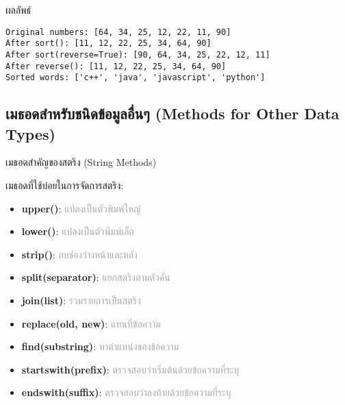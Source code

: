 \documentclass[12pt,a4paper]{article}
\newcommand{\textlight}[1]{{\thailightfont #1}}
\begin{document}
\begin{resultbox}{ผลลัพธ์}
\begin{verbatim}
Original numbers: [64, 34, 25, 12, 22, 11, 90]
After sort(): [11, 12, 22, 25, 34, 64, 90]
After sort(reverse=True): [90, 64, 34, 25, 22, 12, 11]
After reverse(): [11, 12, 22, 25, 34, 64, 90]
Sorted words: ['c++', 'java', 'javascript', 'python']
\end{verbatim}
\end{resultbox}

\vspace{6cm}

\subsection{เมธอดสำหรับชนิดข้อมูลอื่นๆ (Methods for Other Data Types)}

\hspace{1cm}\textlight{เช่นเดียวกับ List สตริง (String) ก็มีเมธอดของตัวเองที่ช่วยจัดการข้อความได้อย่างมีประสิทธิภาพ เมธอดเหล่านี้มีประโยชน์มากในการประมวลผลข้อความ เช่น การทำความสะอาดข้อมูล การค้นหาคำ หรือการแปลงรูปแบบข้อความ ซึ่งเป็นทักษะพื้นฐานที่นักศึกษาจะใช้บ่อยในการเขียนโปรแกรม}

\begin{noticebox}{เมธอดสำคัญของสตริง (String Methods)}

\textlight{เมธอดที่ใช้บ่อยในการจัดการสตริง:}

\begin{itemize}
    \item \textbf{upper()}: \textcolor{darkgray}{แปลงเป็นตัวพิมพ์ใหญ่}
    \item \textbf{lower()}: \textcolor{darkgray}{แปลงเป็นตัวพิมพ์เล็ก}
    \item \textbf{strip()}: \textcolor{darkgray}{ลบช่องว่างหน้าและหลัง}
    \item \textbf{split(separator)}: \textcolor{darkgray}{แยกสตริงตามตัวคั่น}
    \item \textbf{join(list)}: \textcolor{darkgray}{รวมรายการเป็นสตริง}
    \item \textbf{replace(old, new)}: \textcolor{darkgray}{แทนที่ข้อความ}
    \item \textbf{find(substring)}: \textcolor{darkgray}{หาตำแหน่งของข้อความ}
    \item \textbf{startswith(prefix)}: \textcolor{darkgray}{ตรวจสอบว่าเริ่มต้นด้วยข้อความที่ระบุ}
    \item \textbf{endswith(suffix)}: \textcolor{darkgray}{ตรวจสอบว่าลงท้ายด้วยข้อความที่ระบุ}
\end{itemize}

\end{noticebox}
\end{document}
